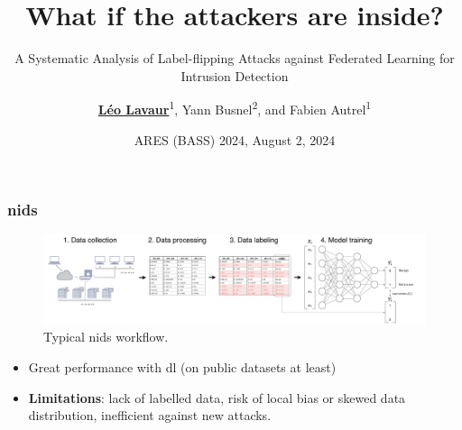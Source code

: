 \documentclass[color,t,presentation,english,aspectratio=169]{beamer}
\title{\vspace{3\baselineskip}What if the attackers are inside?\\}
\subtitle{A Systematic Analysis of Label-flipping Attacks against Federated Learning for Intrusion Detection\\\linebreak}
\author{\underline{\textbf{Léo Lavaur}}\textsuperscript{1}, Yann Busnel\textsuperscript{2}, and Fabien Autrel\textsuperscript{1}}
\institute{\textsuperscript{1} IMT Atlantique, \textsuperscript{2} IMT Nord Europe\\}
\date{ARES (BASS) 2024, August 2, 2024}
\begin{document}
\maketitle

\begin{frame}
	\frametitle{\acrfull{nids}}

	\begin{figure}
		\centering
		\includegraphics[width=\linewidth]{./figures/mlp-workflow.pdf}
		\caption{Typical \acrshort{nids} workflow.}
	\end{figure}

	\begin{itemize}
		\item Great performance with \Gls{dl} (on public datasets at least)
		\item \textbf{Limitations}: lack of labelled data, risk of local bias or skewed data distribution, inefficient against new attacks.
	\end{itemize}

\end{frame}
\end{document}

